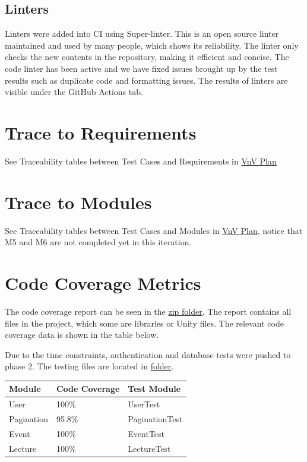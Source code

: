 \documentclass[12pt, titlepage]{article}
\begin{document}
\subsection{Linters}

Linters were added into CI using Super-linter. This is an open source linter maintained and used by many people, which shows its reliability.
The linter only checks the new contents in the repository, making it efficient and concise. 
The code linter has been active and we have fixed issues brought up by the test results such as duplicate code and formatting issues.
The results of linters are visible under the GitHub Actions tab.

\section{Trace to Requirements}
See Traceability tables between Test Cases and Requirements in \href{https://github.com/beatlepie/4G06CapstoneProjectTeam2/blob/main/docs/VnVPlan/VnVPlan.pdf}{VnV Plan}
\section{Trace to Modules}		
See Traceability tables between Test Cases and Modules in \href{https://github.com/beatlepie/4G06CapstoneProjectTeam2/blob/main/docs/VnVPlan/VnVPlan.pdf}{VnV Plan}, notice that M5 and M6 are not completed yet in this iteration.

\section{Code Coverage Metrics}
The code coverage report can be seen in the \href{https://github.com/beatlepie/4G06CapstoneProjectTeam2/blob/main/docs/VnVReport/Report.zip}{zip folder}.
The report contains all files in the project, which some are libraries or Unity files.
The relevant code coverage data is shown in the table below.

Due to the time constraints, authentication and database tests were pushed to phase 2.
The testing files are located in \href{https://github.com/beatlepie/4G06CapstoneProjectTeam2/tree/feat-testing-tests/src/CampusConnections/Assets/Editor}{folder}.

\begin{table}[h]
  \begin{tabular}{lll}
  \hline
  Module                   & Code Coverage & Test Module    \\
  \hline
  User                     & 100\%         & UserTest       \\
  Pagination               & 95.8\%        & PaginationTest \\
  Event                    & 100\%        & EventTest      \\
  Lecture                  & 100\%        & LectureTest    \\
  \hline
  \end{tabular}
  \end{table}
\end{document}
